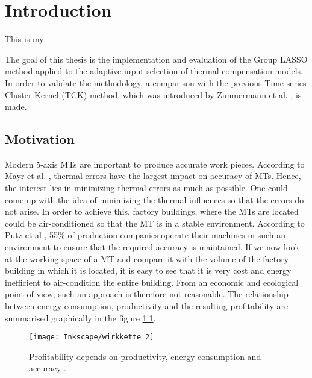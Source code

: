 \setcounter{chapter}{0}

\chapter{Introduction}
\label{sec:introduction}

This is my 

The goal of this thesis is the implementation and evaluation of the Group LASSO method applied to the adaptive input selection of thermal compensation models. In order to validate the methodology, a comparison with the previous Time series Cluster Kernel (TCK) method, which was introduced by Zimmermann et al. \cite{Zimmermann_2020}, is made.


\section{Motivation}
\label{sec:motivation}

Modern 5-axis MTs are important to produce accurate work pieces.  According to Mayr et al. \cite{Mayr_2012}, thermal errors have the largest impact on accuracy of  MTs. Hence, the interest lies in minimizing thermal errors as much as possible. One could come up with the idea of minimizing the thermal influences so that the errors do not arise. In order to achieve this, factory buildings, where the MTs are located could be air-conditioned so that the MT is in a stable environment. According to Putz et al \cite{Putz2018}, 55\% of production companies operate their machines in such an environment to ensure that the required accuracy is maintained. If we now look at the working space of a MT and compare it with the volume of the factory building in which it is located, it is easy to see that it is very cost and energy inefficient to air-condition the entire building. From an economic and ecological point of view, such an approach is therefore not reasonable. The relationship between energy consumption, productivity and the resulting profitability are summarised graphically in the figure \ref{fig:prf_accuracy}. 

\begin{figure}[!htb]
    \centering
    \texttt{[image: Inkscape/wirkkette\_2]} %
    \caption[Economic and technical relationships]{Profitability depends on productivity, energy consumption and accuracy \cite{Weber2015}.}
    \label{fig:prf_accuracy}
\end{figure}
 

